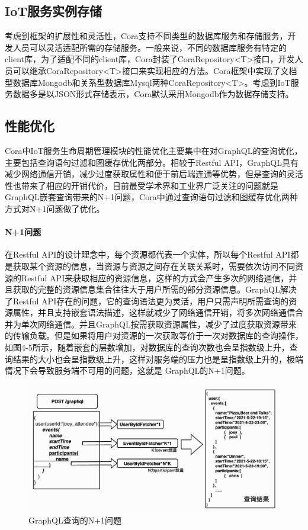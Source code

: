 \documentclass[winfonts,master,twoside]{njuthesis}
\begin{document}
\subsection{IoT服务实例存储}
考虑到框架的扩展性和灵活性，Cora支持不同类型的数据库服务和存储服务，开发人员可以灵活适配所需的存储服务。一般来说，不同的数据库服务有特定的client库，为了适配不同的client库，Cora封装了CoraRepository<T>接口，开发人员可以继承CoraRepository<T>接口来实现相应的方法。Cora框架中实现了文档型数据库Mongodb和关系型数据库Mysql两种CoraRepository<T>。考虑到IoT服务数据多是以JSON形式存储表示，Cora默认采用Mongodb作为数据存储支持。

\subsection{性能优化}
Cora中IoT服务生命周期管理模块的性能优化主要集中在对GraphQL的查询优化，主要包括查询语句过滤和图缓存优化两部分。相较于Restful API，GraphQL具有减少网络通信开销，减少过度获取属性和便于前后端连通等优势，但是查询的灵活性也带来了相应的开销代价，目前最受学术界和工业界广泛关注的问题就是GraphQL嵌套查询带来的N+1问题\cite{hartig2018semantics}，Cora中通过查询语句过滤和图缓存优化两种方式对N+1问题做了优化。

\paragraph{N+1问题}
在Restful API的设计理念中，每个资源都代表一个实体，所以每个Restful API都是获取某个资源的信息，当资源与资源之间存在关联关系时，需要依次访问不同资源的Restful API来获取相应的资源信息，这样的方式会产生多次的网络通信，并且获取的完整的资源信息集合往往大于用户所需的部分资源信息\cite{brito2020rest}。GraphQL解决了Restful API存在的问题，它的查询语法更为灵活，用户只需声明所需查询的资源属性，并且支持嵌套语法描述，这样就减少了网络通信开销，将多次网络通信合并为单次网络通信。并且GraphQL按需获取资源属性，减少了过度获取资源带来的传输负载。但是如果将用户对资源的一次获取等价于一次对数据库的查询操作，如图4-5所示，随着嵌套的层数增加，对数据库的查询次数也会呈指数级上升，查询结果的大小也会呈指数级上升，这样对服务端的压力也是呈指数级上升的，极端情况下会导致服务端不可用的问题，这就是
GraphQL的N+1问题。
\begin{figure}
	\centering
	\includegraphics[width=1\textwidth]{figure/4-cora/graphql_N+1.png}
	\caption{GraphQL查询的N+1问题}
	\label{ontransact-impl}
\end{figure}
\end{document}
